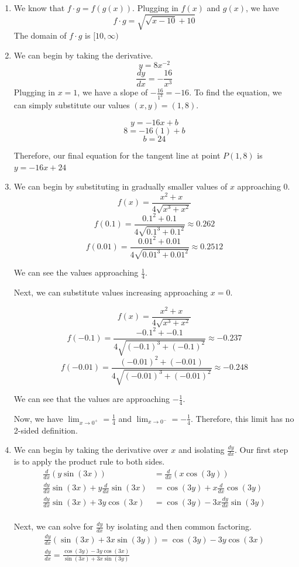 \documentclass[11pt, letterpaper, twoside]{article}
\begin{document}
\begin{enumerate}
\item We know that \(f\cdot g = f(g(x))\). Plugging in \(f(x)\) and \(g(x)\), we have
\[f\cdot g=\sqrt{\sqrt{x-10}+10}\]
The domain of \(f\cdot g\) is \([10, \infty)\)

\item We can begin by taking the derivative.
\[y=8x^{-2}\]
\[\frac{dy}{dx}=-\frac{16}{x^3}\]
Plugging in \(x=1\), we have a slope of \(-\frac{16}{1^3}=-16\). To find the equation, we can simply substitute our values \((x,y)=(1,8)\).

\[y=-16x+b\]
\[8=-16(1)+b\]
\[b=24\]

Therefore, our final equation for the tangent line at point \(P(1,8)\) is \(\boxed{y=-16x+24}\)

\item We can begin by substituting in gradually smaller values of \(x\) approaching 0. 
\[f(x)=\frac{x^2+x}{4\sqrt{x^3+x^2}}\]
\[f(0.1)=\frac{0.1^2+0.1}{4\sqrt{0.1^3+0.1^2}}\approx0.262\]
\[ f(0.01)=\frac{0.01^2+0.01}{4\sqrt{0.01^3+0.01^2}}\approx0.2512\]

We can see the values approaching \(\frac{1}{4}\).

Next, we can substitute values increasing approaching \(x=0\).

\[f(x)=\frac{x^2+x}{4\sqrt{x^3+x^2}}\]
\[f(-0.1)=\frac{-0.1^2+-0.1}{4\sqrt{(-0.1)^3+(-0.1)^2}}\approx-0.237\]
\[f(-0.01)=\frac{(-0.01)^2+(-0.01)}{4\sqrt{(-0.01)^3+(-0.01)^2}}\approx-0.248\]

We can see that the values are approaching \(-\frac{1}{4}\). 

Now, we have \(\lim_{x\to0^+}=\frac{1}{4}\) and \(\lim_{x\to0^-}=-\frac{1}{4}\). Therefore, this limit has no 2-sided definition.

\item We can begin by taking the derivative over \(x\) and isolating \(\frac{dy}{dx}\). Our first step is to apply the product rule to both sides.
\begin{align*}
\frac{d}{dx}(y\sin(3x))&=\frac{d}{dx}(x\cos(3y))\\
\frac{dy}{dx}\sin(3x)+y\frac{d}{dx}\sin(3x)&=\cos(3y)+x\frac{d}{dx}\cos(3y)\\
\frac{dy}{dx}\sin(3x)+3y\cos(3x)&=\cos(3y)-3x\frac{dy}{dx}\sin(3y)\\
\end{align*}

Next, we can solve for \(\frac{dy}{dx}\) by isolating and then common factoring.
\begin{align*}
\frac{dy}{dx}(\sin(3x)+3x\sin(3y))=\cos(3y)-3y\cos(3x)\\
\frac{dy}{dx}=\frac{\cos(3y)-3y\cos(3x)}{\sin(3x)+3x\sin(3y)}
\end{align*}


\end{enumerate}
\end{document}
